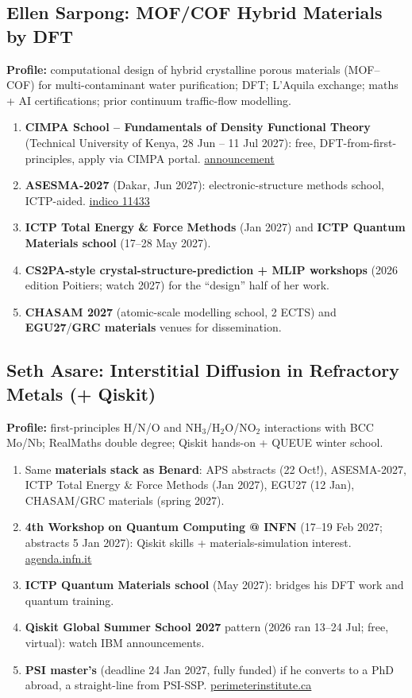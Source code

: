 \documentclass[11pt,a4paper]{article}
\begin{document}
\subsection{Ellen Sarpong: MOF/COF Hybrid Materials by DFT}
\textbf{Profile:} computational design of hybrid crystalline porous materials (MOF--COF) for multi-contaminant water purification; DFT; L'Aquila exchange; maths + AI certifications; prior continuum traffic-flow modelling.
\begin{enumerate}[leftmargin=1.6em]
  \item \textbf{CIMPA School -- Fundamentals of Density Functional Theory} (Technical University of Kenya, 28 Jun -- 11 Jul 2027): free, DFT-from-first-principles, apply via CIMPA portal. \href{https://materials-modelling-group.github.io/events/workshops/2026/03/24/cimpa-school-2027.html}{announcement}
  \item \textbf{ASESMA-2027} (Dakar, Jun 2027): electronic-structure methods school, ICTP-aided. \href{https://indico.ictp.it/event/11433}{indico 11433}
  \item \textbf{ICTP Total Energy \& Force Methods} (Jan 2027) and \textbf{ICTP Quantum Materials school} (17--28 May 2027).
  \item \textbf{CS2PA-style crystal-structure-prediction + MLIP workshops} (2026 edition Poitiers; watch 2027) for the ``design'' half of her work.
  \item \textbf{CHASAM 2027} (atomic-scale modelling school, 2 ECTS) and \textbf{EGU27}/\textbf{GRC materials} venues for dissemination.
\end{enumerate}

\subsection{Seth Asare: Interstitial Diffusion in Refractory Metals (+ Qiskit)}
\textbf{Profile:} first-principles H/N/O and NH$_3$/H$_2$O/NO$_2$ interactions with BCC Mo/Nb; RealMaths double degree; Qiskit hands-on + QUEUE winter school.
\begin{enumerate}[leftmargin=1.6em]
  \item Same \textbf{materials stack as Benard}: APS abstracts (22 Oct!), ASESMA-2027, ICTP Total Energy \& Force Methods (Jan 2027), EGU27 (12 Jan), CHASAM/GRC materials (spring 2027).
  \item \textbf{4th Workshop on Quantum Computing @ INFN} (17--19 Feb 2027; abstracts 5 Jan 2027): Qiskit skills + materials-simulation interest. \href{https://agenda.infn.it/event/53380/abstracts/}{agenda.infn.it}
  \item \textbf{ICTP Quantum Materials school} (May 2027): bridges his DFT work and quantum training.
  \item \textbf{Qiskit Global Summer School 2027} pattern (2026 ran 13--24 Jul; free, virtual): watch IBM announcements.
  \item \textbf{PSI master's} (deadline 24 Jan 2027, fully funded) if he converts to a PhD abroad, a straight-line from PSI-SSP. \href{https://perimeterinstitute.ca/training/masters-program/psi-how-apply}{perimeterinstitute.ca}
\end{enumerate}
\end{document}
